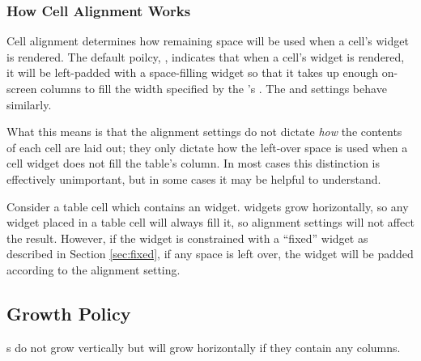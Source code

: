 \subsubsection{How Cell Alignment Works}

Cell alignment determines how remaining space will be used when a
cell's widget is rendered.  The default poilcy, ,
indicates that when a cell's widget is rendered, it will be
left-padded with a space-filling widget so that it takes up enough
on-screen columns to fill the width specified by the 's
.  The  and  settings
behave similarly.

What this means is that the alignment settings do not dictate
\textit{how} the contents of each cell are laid out; they only dictate
how the left-over space is used when a cell widget does not fill the
table's column.  In most cases this distinction is effectively
unimportant, but in some cases it may be helpful to understand.

Consider a table cell which contains an  widget.  
widgets grow horizontally, so any  widget placed in a table
cell will always fill it, so alignment settings will not affect the
result.  However, if the  widget is constrained with a
``fixed'' widget as described in Section \ref{sec:fixed}, if any space
is left over, the widget will be padded according to the alignment
setting.

\subsection{Growth Policy}

s do not grow vertically but will grow horizontally if they
contain any  columns.
